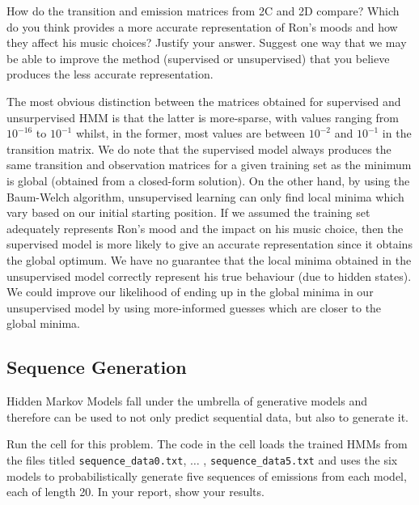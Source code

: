\problem[5] How do the transition and emission matrices from 2C and 2D compare? Which do you think provides a more accurate representation of Ron's moods and how they affect his music choices? Justify your answer. Suggest one way that we may be able to improve the method (supervised or unsupervised) that you believe produces the less accurate representation. 

\begin{solution}
  The most obvious distinction between the matrices obtained for supervised and unsurpervised HMM is that the latter is more-sparse, with values ranging from $10^{-16}$ to $10^{-1}$ whilst, in the former, most values are between $10^{-2}$ and $10^{-1}$ in the transition matrix. We do note that the supervised model always produces the same transition and observation matrices for a given training set as the minimum is global (obtained from a closed-form solution). On the other hand, by using the Baum-Welch algorithm, unsupervised learning can only find local minima which vary based on our initial starting position. If we assumed the training set adequately represents Ron's mood and the impact on his music choice, then the supervised model is more likely to give an accurate representation since it obtains the global optimum. We have no guarantee that the local minima obtained in the unsupervised model correctly represent his true behaviour (due to hidden states). We could improve our likelihood of ending up in the global minima in our unsupervised model by using more-informed guesses which are closer to the global minima. 
\end{solution}

\subsection{Sequence Generation}
Hidden Markov Models fall under the umbrella of generative models and therefore can be used to not only predict sequential data, but also to generate it.

\problem[5] Run the cell for this problem. The code in the cell loads the trained HMMs from the files titled \texttt{sequence_data0.txt}, $\ldots$ , \texttt{sequence_data5.txt} and uses the six models to probabilistically generate five sequences of emissions from each model, each of length 20. In your report, show your results. 


